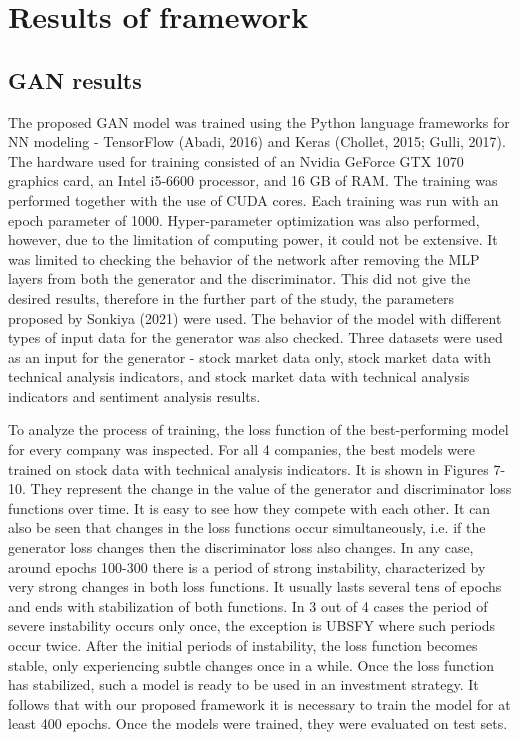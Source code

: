 \documentclass[11pt]{article} %
\begin{document}
\section{Results of framework}

\subsection{GAN results}

The proposed GAN model was trained using the Python language frameworks for NN modeling - TensorFlow (Abadi, 2016) and Keras (Chollet, 2015; Gulli, 2017). The hardware used for training consisted of an Nvidia GeForce GTX 1070 graphics card, an Intel i5-6600 processor, and 16 GB of RAM. The training was performed together with the use of CUDA cores. Each training was run with an epoch parameter of 1000. Hyper-parameter optimization was also performed,  however, due to the limitation of computing power, it could not be extensive. It was limited to checking the behavior of the network after removing the MLP layers from both the generator and the discriminator. This did not give the desired results, therefore in the further part of the study, the parameters proposed by Sonkiya (2021) were used. The behavior of the model with different types of input data for the generator was also checked. Three datasets were used as an input for the generator - stock market data only, stock market data with technical analysis indicators, and stock market data with technical analysis indicators and sentiment analysis results.

To analyze the process of training, the loss function of the best-performing model for every company was inspected. For all 4 companies, the best models were trained on stock data with technical analysis indicators. It is shown in Figures 7-10. They represent the change in the value of the generator and discriminator loss functions over time. It is easy to see how they compete with each other. It can also be seen that changes in the loss functions occur simultaneously, i.e. if the generator loss changes then the discriminator loss also changes. In any case, around epochs 100-300 there is a period of strong instability, characterized by very strong changes in both loss functions. It usually lasts several tens of epochs and ends with stabilization of both functions. In 3 out of 4 cases the period of severe instability occurs only once, the exception is UBSFY where such periods occur twice. After the initial periods of instability, the loss function becomes stable, only experiencing subtle changes once in a while. Once the loss function has stabilized, such a model is ready to be used in an investment strategy. It follows that with our proposed framework it is necessary to train the model for at least 400 epochs. Once the models were trained, they were evaluated on test sets. 
\end{document}
